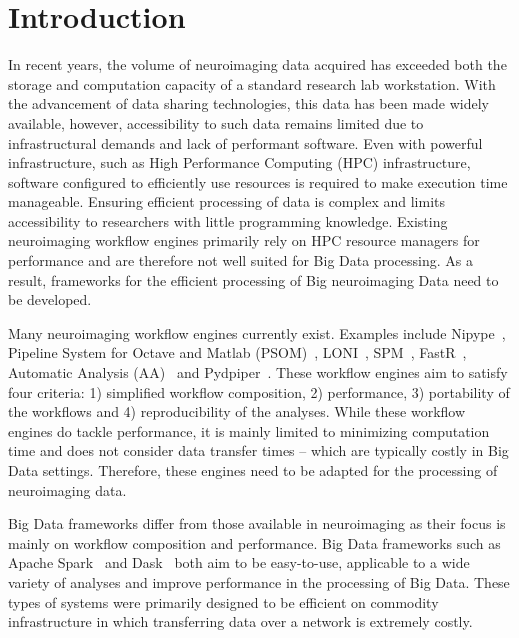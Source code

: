 \documentclass{report}
\begin{document}
    \chapter{Introduction}
        In recent years, the volume of neuroimaging data acquired has exceeded
        both the storage and computation capacity of a standard research 
        lab workstation. With the advancement of data sharing technologies, 
        this data has been made widely available, however, accessibility to 
        such data remains limited due to infrastructural demands and lack of 
        performant software. Even with powerful infrastructure, such as High
        Performance Computing (HPC) infrastructure, software configured to 
        efficiently use resources is required to make execution time manageable. 
        Ensuring efficient processing of data is 
        complex and limits accessibility to researchers with little programming 
        knowledge. Existing neuroimaging workflow engines primarily rely on HPC
        resource managers for performance and are therefore not well suited for
        Big Data processing. As a result, frameworks for the efficient 
        processing of Big neuroimaging Data need to be developed.
        
        Many neuroimaging workflow engines currently exist. Examples include
        Nipype~\cite{nipype}, Pipeline System for Octave and Matlab 
        (PSOM)~\cite{10.3389/fninf.2012.00007}, LONI~\cite{REX20031033}, 
        SPM~\cite{spm}, FastR~\cite{10.3389/fict.2016.00015},
        Automatic Analysis (AA)~\cite{10.3389/fninf.2014.00090} and 
        Pydpiper~\cite{10.3389/fninf.2014.00067}. These 
        workflow engines aim to satisfy four criteria: 1) simplified
        workflow composition, 2) performance, 3) portability of the workflows 
        and 4) reproducibility of the analyses. While these workflow engines
        do tackle performance, it is mainly limited to minimizing computation
        time and does not consider data transfer times -- which are typically
        costly in Big Data settings. Therefore, these engines need to be adapted
        for the processing of neuroimaging data.

        Big Data frameworks differ from those available in neuroimaging as their
        focus is mainly on workflow composition and performance. Big Data 
        frameworks such as Apache Spark~\cite{Zaharia:2016:ASU:3013530.2934664} 
        and Dask~\cite{rocklin2015dask} both aim to be easy-to-use,
        applicable to a wide variety of analyses and improve performance in the 
        processing of Big Data. These types of systems were primarily designed 
        to be efficient on commodity infrastructure in which transferring data
        over a network is extremely costly.
\end{document}
